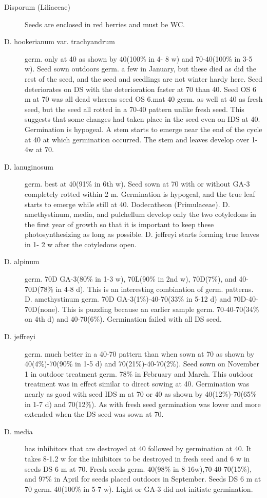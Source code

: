 \begin{description}
\item[Disporum (Liliaceae)] Seeds are enclosed in red berries and must be WC.
\item[D. hookerianum var. trachyandrum] germ. only at 40 as shown by 40(100\% in 4-
8 w) and 70-40(100\% in 3-5 w). Seed sown outdoors germ. a few in January, but
these died as did the rest of the seed, and the seed and seedlings are not winter hardy
here. Seed deteriorates on DS with the deterioration faster at 70 than 40. Seed OS 6
m at 70 was all dead whereas seed OS 6.mat 40 germ. as well at 40 as fresh seed,
but the seed all rotted in a 70-40 pattern unlike fresh seed. This suggests that some
changes had taken place in the seed even on IDS at 40. Germination is hypogeal. A
stem starts to emerge near the end of the cycle at 40 at which germination occurred.
The stem and leaves develop over 1-4w at 70.

\item[D. lanuginosum] germ. best at 40(91\% in 6th w). Seed sown at 70 with or
without GA-3 completely rotted within 2 m. Germination is hypogeal, and the true leaf
starts to emerge while still at 40.
Dodecatheon (Primulaceae). D. amethystinum, media, and pulchellum
develop only the two cotyledons in the first year of growth so that it is important to keep
these photosynthesizing as long as possible. D. jeffreyi starts forming true leaves in 1-
2 w after the cotyledons open.

\item[D. alpinum] germ. 70D GA-3(80\% in 1-3 w), 70L(90\% in 2nd w), 70D(7\%), and
40-70D(78\% in 4-8 d). This is an interesting combination of germ. patterns.
D. amethystinum germ. 70D GA-3(1\%)-40-70(33\% in 5-12 d) and 70D-40-
70D(none). This is puzzling because an earlier sample germ. 70-40-70(34\% on 4th d)
and 40-70(6\%). Germination failed with all DS seed.

\item[D. jeffreyi] germ. much better in a 40-70 pattern than when sown at 70 as shown
by 40(4\%)-70(90\% in 1-5 d) and 70(21\%)-40-70(2\%). Seed sown on November 1 in
outdoor treatment germ. 78\% in February and March. This outdoor treatment was in
effect similar to direct sowing at 40. Germination was nearly as good with seed IDS m
at 70 or 40 as shown by 40(12\%)-70(65\% in 1-7 d) and 70(12\%). As with fresh seed
germination was lower and more extended when the DS seed was sown at 70.

\item[D. media] has inhibitors that are destroyed at 40 followed by germination at 40.
It takes 8-1.2 w for the inhibitors to be destroyed in fresh seed and 6 w in seeds DS 6 m
at 70. Fresh seeds germ. 40(98\% in 8-16w),70-40-70(15\%), and 97\% in April for
seeds placed outdoors in September. Seeds DS 6 m at 70 germ. 40(100\% in 5-7 w).
Light or GA-3 did not initiate germination.


\end{description}

